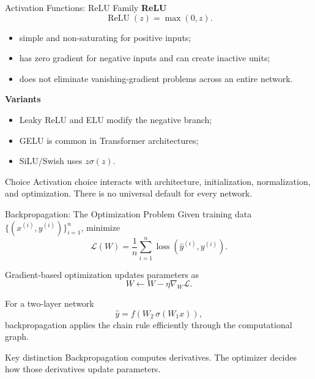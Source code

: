 \begin{frame}{Activation Functions: ReLU Family}
\textbf{ReLU}
\[
  \operatorname{ReLU}(z)=\max(0,z).
\]
\begin{itemize}
  \item simple and non-saturating for positive inputs;
  \item has zero gradient for negative inputs and can create inactive units;
  \item does not eliminate vanishing-gradient problems across an entire network.
\end{itemize}

\textbf{Variants}
\begin{itemize}
  \item Leaky ReLU and ELU modify the negative branch;
  \item GELU is common in Transformer architectures;
  \item SiLU/Swish uses $z\sigma(z)$.
\end{itemize}

\begin{alertblock}{Choice}
Activation choice interacts with architecture, initialization, normalization, and optimization. There is no universal default for every network.
\end{alertblock}
\end{frame}

\begin{frame}{Backpropagation: The Optimization Problem}
Given training data $\{(x^{(i)},y^{(i)})\}_{i=1}^n$, minimize
\[
  \mathcal{L}(W)=\frac{1}{n}\sum_{i=1}^n \operatorname{loss}(\hat y^{(i)},y^{(i)}).
\]

Gradient-based optimization updates parameters as
\[
  W \leftarrow W - \eta\nabla_W\mathcal{L}.
\]

For a two-layer network
\[
  \hat y=f\!\left(W_2\,\sigma(W_1x)\right),
\]
backpropagation applies the chain rule efficiently through the computational graph.

\begin{block}{Key distinction}
Backpropagation computes derivatives. The optimizer decides how those derivatives update parameters.
\end{block}
\end{frame}

